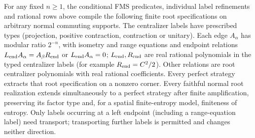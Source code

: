 \begin{lemma}\label{lem:chain}
For any fixed $n\geq1$, the conditional FMS predicates, individual label refinements and rational rows above compile the following finite root specifications on arbitrary normal commuting supports. The centralizer labels have prescribed types (projection, positive contraction, contraction or unitary). Each edge $A_\alpha$ has modular ratio $2^{-n}$, with isometry and range equations and endpoint relations $L_{\rm end}A_\alpha=A_\beta R_{\rm end}$ or $L_{\rm end}A_\alpha=0$; $L_{\rm end},R_{\rm end}$ are real rational polynomials in the typed centralizer labels (for example $R_{\rm end}=C^2/2$). Other relations are root centralizer polynomials with real rational coefficients. Every perfect strategy extracts that root specification on a nonzero corner. Every faithful normal root realization extends simultaneously to a perfect strategy after finite amplification, preserving its factor type and, for a spatial finite-entropy model, finiteness of entropy. Only labels occurring at a left endpoint (including a range-equation label) need transport; transporting further labels is permitted and changes neither direction.
\end{lemma}
